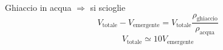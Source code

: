 \begin{Es}[Iceberg]
Ghiaccio in acqua $\Longrightarrow$ si scioglie
$$V_\text{totale}-V_\text{emergente}=V_\text{totale}\frac{\rho_\text{ghiaccio}}{\rho_\text{acqua}}$$
$$V_\text{totale}\simeq 10 V_\text{emergente}$$
\end{Es}
